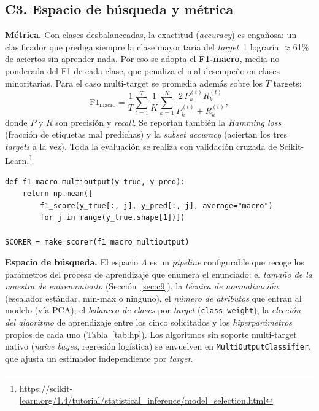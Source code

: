 \documentclass[11pt,a4paper,twocolumn]{article}
\begin{document}
\subsection{C3. Espacio de búsqueda y métrica}
\label{sec:metrica}
\textbf{Métrica.} Con clases desbalanceadas, la exactitud (\textit{accuracy}) es engañosa: un clasificador
que prediga siempre la clase mayoritaria del \textit{target}~1 lograría $\approx$61\% de aciertos sin
aprender nada. Por eso se adopta el \textbf{F1-macro}, media no ponderada del F1 de cada clase, que penaliza
el mal desempeño en clases minoritarias. Para el caso multi-target se promedia además sobre los $T$ targets:
\begin{equation}
\text{F1}_{\text{macro}}=\frac{1}{T}\sum_{t=1}^{T}\frac{1}{K}\sum_{k=1}^{K}\frac{2\,P^{(t)}_k R^{(t)}_k}{P^{(t)}_k+R^{(t)}_k},
\label{eq:f1}
\end{equation}
donde $P$ y $R$ son precisión y \textit{recall}. Se reportan también la \emph{Hamming loss} (fracción de
etiquetas mal predichas) y la \emph{subset accuracy} (aciertan los tres \textit{targets} a la vez). Toda la
evaluación se realiza con validación cruzada de Scikit-Learn.\footnote{\scriptsize\url{https://scikit-learn.org/1.4/tutorial/statistical_inference/model_selection.html}}

\begin{lstlisting}[caption={C3 -- Métrica F1-macro multi-target como scorer de Scikit-Learn}]
def f1_macro_multioutput(y_true, y_pred):
    return np.mean([
        f1_score(y_true[:, j], y_pred[:, j], average="macro")
        for j in range(y_true.shape[1])])

SCORER = make_scorer(f1_macro_multioutput)
\end{lstlisting}

\textbf{Espacio de búsqueda.} El espacio $\Lambda$ es un \textit{pipeline} configurable que recoge los
parámetros del proceso de aprendizaje que enumera el enunciado: el \emph{tamaño de la muestra de
entrenamiento} (Sección~\ref{sec:c9}), la \emph{técnica de normalización} (escalador estándar, min-max o
ninguno), el \emph{número de atributos} que entran al modelo (vía PCA), el \emph{balanceo de clases} por
\textit{target} (\texttt{class\_weight}), la \emph{elección del algoritmo} de aprendizaje entre los cinco
solicitados y los \emph{hiperparámetros} propios de cada uno (Tabla~\ref{tab:hp}). Los algoritmos sin
soporte multi-target nativo (\textit{naive bayes}, regresión logística) se envuelven en
\texttt{MultiOutputClassifier}, que ajusta un estimador independiente por \textit{target}.
\end{document}
